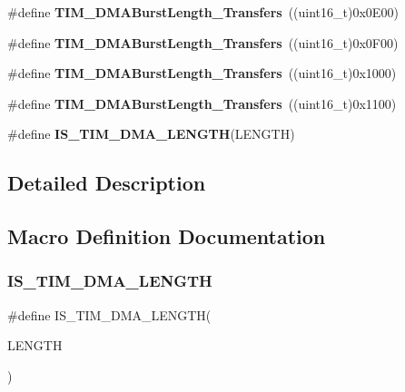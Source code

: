 \begin{DoxyCompactItemize}
\item 
\#define \textbf{ T\+I\+M\+\_\+\+D\+M\+A\+Burst\+Length\+\_\+Transfers}~((uint16\+\_\+t)0x0\+E00)
\item 
\#define \textbf{ T\+I\+M\+\_\+\+D\+M\+A\+Burst\+Length\+\_\+Transfers}~((uint16\+\_\+t)0x0\+F00)
\item 
\#define \textbf{ T\+I\+M\+\_\+\+D\+M\+A\+Burst\+Length\+\_\+Transfers}~((uint16\+\_\+t)0x1000)
\item 
\#define \textbf{ T\+I\+M\+\_\+\+D\+M\+A\+Burst\+Length\+\_\+Transfers}~((uint16\+\_\+t)0x1100)
\item 
\#define \textbf{ I\+S\+\_\+\+T\+I\+M\+\_\+\+D\+M\+A\+\_\+\+L\+E\+N\+G\+TH}(L\+E\+N\+G\+TH)
\end{DoxyCompactItemize}


\subsection{Detailed Description}


\subsection{Macro Definition Documentation}
\mbox{\label{group__TIM__DMA__Burst__Length_gafd09cf0887b01a15101ba7dd6e2b4ba7}} 
\subsubsection{I\+S\+\_\+\+T\+I\+M\+\_\+\+D\+M\+A\+\_\+\+L\+E\+N\+G\+TH}
{\footnotesize\ttfamily \#define I\+S\+\_\+\+T\+I\+M\+\_\+\+D\+M\+A\+\_\+\+L\+E\+N\+G\+TH(\begin{DoxyParamCaption}\item[{}]{L\+E\+N\+G\+TH }\end{DoxyParamCaption})}

